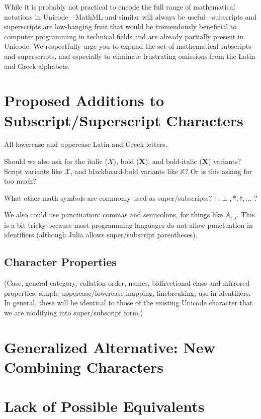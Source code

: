 \documentclass[10pt,english]{article}
\begin{document}
While it is probably not practical to encode the full range of mathematical
notations in Unicode---MathML and similar will always be useful---subscripts
and superscripts are low-hanging fruit that would be tremendously
beneficial to computer programming in technical fields and are already
partially present in Unicode. We respectfully urge you to expand the
set of mathematical subscripts and superscripts, and especially to
eliminate frustrating omissions from the Latin and Greek alphabets.


\section{Proposed Additions to Subscript/Superscript Characters}

All lowercase and uppercase Latin and Greek letters.

Should we also ask for the italic ($\mathit{{X}}$), bold ($\mathbf{{X}}$),
and bold-italic ($\mathbf{\mathit{\boldsymbol{{X}}}}$) variants?
Script variants like $\mathscr{X}$, and blackboard-bold variants
like $\mathbb{{X}}$? Or is this asking for too much?

What other math symbols are commonly used as super/subscripts? $\Vert,\perp,*,\dagger,\ldots$
?

We also could use punctuation: commas and semicolons, for things like
$A_{i,j}$. This is a bit tricky because most programming languages
do not allow punctuation in identifiers (although Julia allows super/subscript
parentheses).


\subsection{Character Properties}

(Case, general category, collation order, names, bidirectional class
and mirrored properties, simple uppercase/lowercase mapping, linebreaking,
use in identifiers. In general, these will be identical to those of
the existing Unicode character that we are modifying into super/subscript
form.)


\section{Generalized Alternative: New Combining Characters}


\section{Lack of Possible Equivalents}
\end{document}
